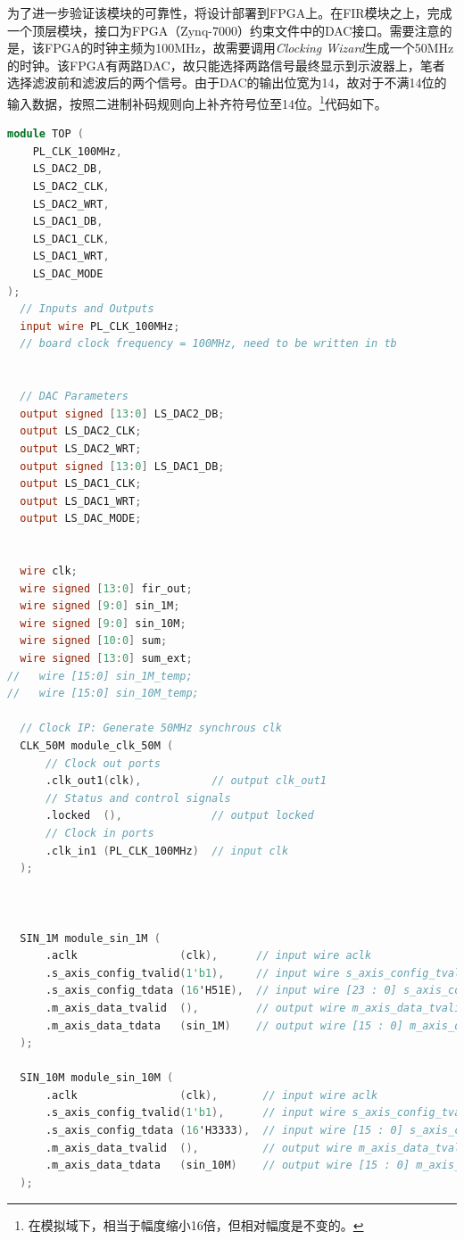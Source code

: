 为了进一步验证该模块的可靠性，将设计部署到FPGA上。在FIR模块之上，完成一个顶层模块，接口为FPGA（Zynq-7000）约束文件中的DAC接口。需要注意的是，该FPGA的时钟主频为100MHz，故需要调用\textit{Clocking Wizard}生成一个50MHz的时钟。该FPGA有两路DAC，故只能选择两路信号最终显示到示波器上，笔者选择滤波前和滤波后的两个信号。由于DAC的输出位宽为14，故对于不满14位的输入数据，按照二进制补码规则向上补齐符号位至14位。\footnote{在模拟域下，相当于幅度缩小16倍，但相对幅度是不变的。}代码如下。

\begin{lstlisting}[language=verilog,caption={顶层模块}]
  module TOP (
    PL_CLK_100MHz,
    LS_DAC2_DB,
    LS_DAC2_CLK,
    LS_DAC2_WRT,
    LS_DAC1_DB,
    LS_DAC1_CLK,
    LS_DAC1_WRT,
    LS_DAC_MODE
);
  // Inputs and Outputs
  input wire PL_CLK_100MHz;
  // board clock frequency = 100MHz, need to be written in tb


  // DAC Parameters
  output signed [13:0] LS_DAC2_DB;
  output LS_DAC2_CLK;
  output LS_DAC2_WRT;
  output signed [13:0] LS_DAC1_DB;
  output LS_DAC1_CLK;
  output LS_DAC1_WRT;
  output LS_DAC_MODE;


  wire clk;
  wire signed [13:0] fir_out;
  wire signed [9:0] sin_1M;
  wire signed [9:0] sin_10M;
  wire signed [10:0] sum;
  wire signed [13:0] sum_ext;
//   wire [15:0] sin_1M_temp;
//   wire [15:0] sin_10M_temp;

  // Clock IP: Generate 50MHz synchrous clk 
  CLK_50M module_clk_50M (
      // Clock out ports
      .clk_out1(clk),           // output clk_out1
      // Status and control signals
      .locked  (),              // output locked
      // Clock in ports
      .clk_in1 (PL_CLK_100MHz)  // input clk
  );



  SIN_1M module_sin_1M (
      .aclk                (clk),      // input wire aclk
      .s_axis_config_tvalid(1'b1),     // input wire s_axis_config_tvalid
      .s_axis_config_tdata (16'H51E),  // input wire [23 : 0] s_axis_config_tdata
      .m_axis_data_tvalid  (),         // output wire m_axis_data_tvalid
      .m_axis_data_tdata   (sin_1M)    // output wire [15 : 0] m_axis_data_tdata
  );

  SIN_10M module_sin_10M (
      .aclk                (clk),       // input wire aclk
      .s_axis_config_tvalid(1'b1),      // input wire s_axis_config_tvalid
      .s_axis_config_tdata (16'H3333),  // input wire [15 : 0] s_axis_config_tdata
      .m_axis_data_tvalid  (),          // output wire m_axis_data_tvalid
      .m_axis_data_tdata   (sin_10M)    // output wire [15 : 0] m_axis_data_tdata
  );


\end{lstlisting}
